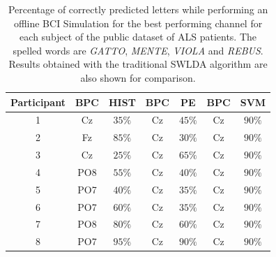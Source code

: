 \documentclass[utf8]{frontiersSCNS} %
\begin{document}
\begin{table}[htb]
\caption{Percentage of correctly predicted letters while performing an offline BCI Simulation for the best performing channel for each subject of the public dataset of ALS patients. The spelled words are \textit{GATTO}, \textit{MENTE}, \textit{VIOLA} and \textit{REBUS}. Results obtained with the traditional SWLDA algorithm are also shown for comparison.}
\centering
\begin{tabular}{ccccccc}
\toprule
\textbf{Participant}	&  \textbf{BPC}	&  HIST &  \textbf{BPC}	&  PE &  \textbf{BPC}	 &  SVM\\
\midrule
1     &     Cz   &   $35\%$  &  Cz   & $45\%$  &  Cz   & $90\%$  \\
2     &     Fz   &   $85\%$  &  Cz   & $30\%$    &  Cz   & $90\%$  \\
3     &     Cz   &   $25\%$  &  Cz   & $65\%$  &  Cz   & $90\%$  \\
4     &     PO8 &   $55\%$ &  Cz   & $40\%$   &  Cz   & $90\%$  \\
5     &     PO7 &   $40\%$ &  Cz   & $35\%$   &  Cz   & $90\%$  \\
6     &     PO7 &   $60\%$ &   Cz   & $35\%$  &  Cz   & $90\%$   \\
7     &     PO8 &   $80\%$ &  Cz   & $60\%$   &  Cz   & $90\%$   \\
8     &     PO7 &   $95\%$  &  Cz   & $90\%$   &  Cz   & $90\%$  \\

\end{tabular}
\label{tab:results}
\end{table}
\end{document}
